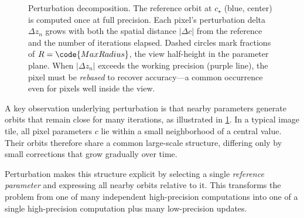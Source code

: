 \begin{figure}[!htbp]
\caption[Perturbation decomposition: spatial delta growth]{%
  Perturbation decomposition.  The reference orbit at $c_\star$
  (blue, center) is computed once at full precision.  Each pixel's
  perturbation delta $\Delta z_n$ grows with both the spatial distance
  $|\Delta c|$ from the reference and the number of iterations elapsed.
  Dashed circles mark fractions of $R = \code{MaxRadius}$, the view
  half-height in the parameter plane.  When $|\Delta z_n|$ exceeds the
  working precision (purple line), the pixel must be \emph{rebased}
  to recover accuracy---a common occurrence even for pixels well
  inside the view.}
\label{fig:perturbation-delta}
\end{figure}

A key observation underlying perturbation is that nearby parameters generate
orbits that remain close for many iterations, as illustrated in
\cref{fig:perturbation-delta}. In a typical image tile, all pixel
parameters \(c\) lie within a small neighborhood of a central value. Their
orbits therefore share a common large-scale structure, differing only by small
corrections that grow gradually over time.

Perturbation makes this structure explicit by selecting a single
\emph{reference parameter} and expressing all nearby orbits relative to it. This
transforms the problem from one of many independent high-precision computations
into one of a single high-precision computation plus many low-precision updates.

